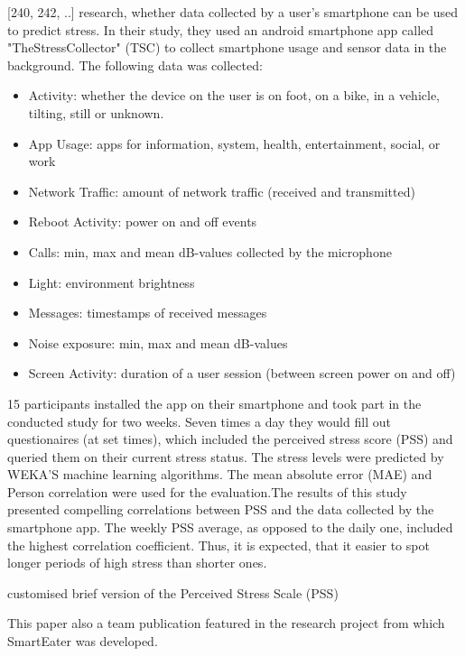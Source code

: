\textcite{SmartphoneBasedStressPrediction2015}[240, 242, ..] research, whether data collected by a user's smartphone can be used to predict stress. In their study, they used an android smartphone app called "TheStressCollector" (TSC) to collect smartphone usage and sensor data in the background. The following data was collected:
\begin{itemize}
  \item Activity: whether the device on the user is on foot, on a bike, in a vehicle, tilting, still or unknown.
  \item App Usage: apps for information, system, health, entertainment, social, or work
  \item Network Traffic: amount of network traffic (received and transmitted)
  \item Reboot Activity: power on and off events
  \item Calls: min, max and mean dB-values collected by the microphone
  \item Light: environment brightness
  \item Messages: timestamps of received messages
  \item Noise exposure: min, max and mean dB-values
  \item Screen Activity: duration of a user session (between screen power on and off)
\end{itemize}

15 participants installed the app on their smartphone and took part in the conducted study for two weeks. Seven times a day they would fill out questionaires (at set times), which included the perceived stress score (PSS) and queried them on their current stress status. The stress levels were predicted by WEKA'S machine learning algorithms. The mean absolute error (MAE) and Person correlation were used for the evaluation.The results of this study presented compelling correlations between PSS and the data collected by the smartphone app. The weekly PSS average, as opposed to the daily one, included the highest correlation coefficient. Thus, it is expected, that it easier to spot longer periods of high stress than shorter ones. 

customised brief version of the Perceived Stress Scale (PSS)

This paper also a team publication featured in the research project from which SmartEater was developed.








